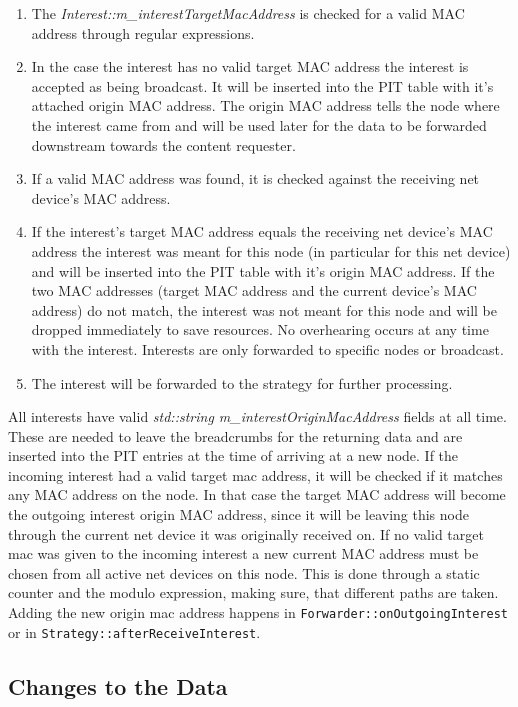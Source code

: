 \begin{enumerate}
\item The \emph{Interest::m\_interestTargetMacAddress} is checked for a valid MAC address through regular expressions.
\item In the case the interest has no valid target MAC address the interest is accepted as being broadcast. It will be inserted into the PIT table with it's attached origin MAC address. The origin MAC address tells the node where the interest came from and will be used later for the data to be forwarded downstream towards the content requester.
\item If a valid MAC address was found, it is checked against the receiving net device's MAC address.
\item If the interest's target MAC address equals the receiving net device's MAC address the interest was meant for this node (in particular for this net device) and will be inserted into the PIT table with it's origin MAC address. If the two MAC addresses (target MAC address and the current device's MAC address) do not match, the interest was not meant for this node and will be dropped immediately to save resources. No overhearing occurs at any time with the interest. Interests are only forwarded to specific nodes or broadcast.
\item The interest will be forwarded to the strategy for further processing.
\end{enumerate}

All interests have valid \emph{std::string m\_interestOriginMacAddress} fields at all time. These are needed to leave the breadcrumbs for the returning data and are inserted into the PIT entries at the time of arriving at a new node. If the incoming interest had a valid target mac address, it will be checked if it matches any MAC address on the node. In that case the target MAC address will become the outgoing interest origin MAC address, since it will be leaving this node through the current net device it was originally received on. If no valid target mac was given to the incoming interest a new current MAC address must be chosen from all active net devices on this node. This is done through a static counter and the modulo expression, making sure, that different paths are taken. Adding the new origin mac address happens in \texttt{Forwarder::onOutgoingInterest} or in \texttt{Strategy::afterReceiveInterest}.

\subsection{Changes to the Data}

